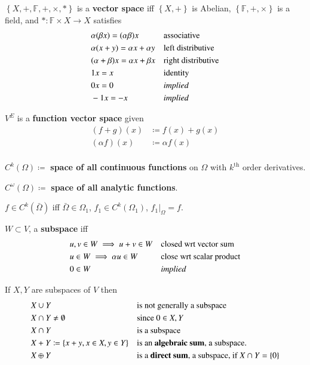 \documentclass[letterpaper,11pt]{amsart}
\newcommand{\keyphrase}[1]{\textbf{#1}}
\begin{document}
$\left\{X, +, \mathbb{F}, +, \times, \ast \right\}$ is a
\keyphrase{vector space} iff
$\left\{X,+\right\}$ is Abelian,
$\left\{ \mathbb{F}, +, \times \right\}$ is a field, and
$\ast:\mathbb{F}\times{}X\to{}X$ satisfies
\begin{align*}
    & \alpha (\beta x) = (\alpha \beta) x
    & &\text{associative}\\
    & \alpha (x+y) = \alpha x+\alpha y
    & &\text{left distributive}\\
    & (\alpha+\beta) x = \alpha x+\beta x
    & &\text{right distributive}\\
    & 1 x = x
    & &\text{identity}\\
    & 0 x = 0
    & &\text{\emph{implied}}\\
    & -1 x = -x
    & &\text{\emph{implied}}\\
\end{align*}

$V^{E}$ is a \keyphrase{function vector space} given
\begin{align*}
    \left( f+g \right)(x) &\coloneqq f(x)+g(x) \\
    \left( \alpha f \right)(x) &\coloneqq \alpha f(x) \\
\end{align*}

$C^{k}(\Omega) \coloneqq$ \keyphrase{space of all continuous functions}
on $\Omega$ with $k^{\textrm{th}}$ order derivatives.

$C^{\omega}(\Omega) \coloneqq$ \keyphrase{space of all analytic functions}.

$f\in{}C^{k}(\bar{\Omega})$ iff
$\bar{\Omega}\in\Omega_{1}$, $f_{1}\in{}C^{k}(\Omega_{1})$,
$f_{1}\Big|_{\Omega} = f$.

$W\subset{}V$, a \keyphrase{subspace} iff
\begin{align*}
    &u,v\in{}W\implies{}u+v\in{}W
    & &\text{closed wrt vector sum} \\
    &u\in{}W \implies \alpha{}u\in{}W
    & &\text{close wrt scalar product} \\
    & 0\in{W}
    & &\text{\emph{implied}} \\
\end{align*}

If $X,Y$ are subspaces of $V$ then
\begin{align*}
    &X\cup{Y}
    & &\text{is not generally a subspace} \\
    &X\cap{Y} \neq \emptyset
    & &\text{since $0\in{}X,Y$} \\
    &X\cap{Y}
    & &\text{is a subspace} \\
    &X+Y \coloneqq \left\{ x+y, x\in{X}, y\in{}Y \right\}
    & &\text{is an \keyphrase{algebraic sum}, a subspace.} \\
    &X\oplus{}Y
    & &\text{is a \keyphrase{direct sum}, a subspace, if $X\cap{Y}=\{0\}$} \\
\end{align*}
\end{document}

